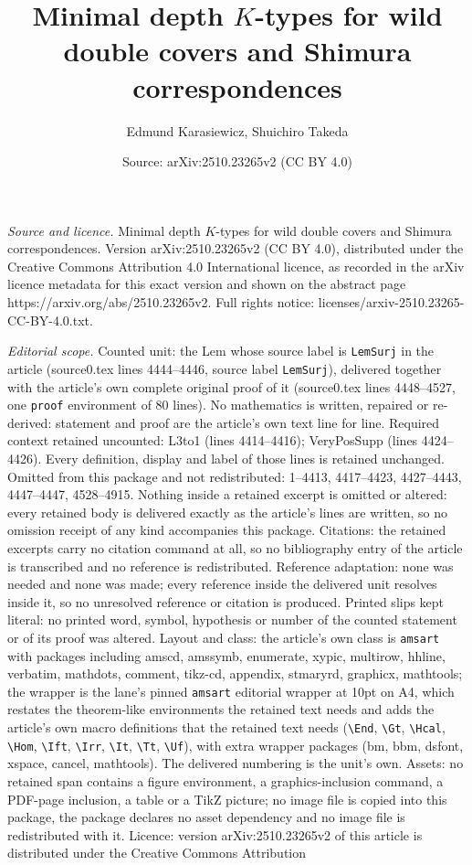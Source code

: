 \documentclass[10pt,a4paper]{amsart}
\title[Minimal depth $K$-types for wild double covers and Shimura c]{Minimal depth $K$-types for wild double covers and Shimura correspondences}
\author{Edmund Karasiewicz, Shuichiro Takeda}
\date{Source: arXiv:2510.23265v2 (CC BY 4.0)}
\begin{document}
\maketitle

\noindent\emph{Source and licence.} Minimal depth $K$-types for wild double covers and Shimura correspondences. Version arXiv:2510.23265v2 (CC BY 4.0), distributed under the Creative Commons Attribution 4.0 International licence, as recorded in the arXiv licence metadata for this exact version and shown on the abstract page https://arxiv.org/abs/2510.23265v2. Full rights notice: licenses/arxiv-2510.23265-CC-BY-4.0.txt.\par\smallskip

\noindent\textit{Editorial scope.} Counted unit: the Lem whose source label is \texttt{LemSurj} in the article (source0.tex lines 4444--4446, source label \texttt{LemSurj}), delivered together with the article's own complete original proof of it (source0.tex lines 4448--4527, one \texttt{proof} environment of 80 lines). No mathematics is written, repaired or re-derived: statement and proof are the article's own text line for line. Required context retained uncounted: L3to1 (lines 4414--4416); VeryPosSupp (lines 4424--4426). Every definition, display and label of those lines is retained unchanged. Omitted from this package and not redistributed: 1--4413, 4417--4423, 4427--4443, 4447--4447, 4528--4915. Nothing inside a retained excerpt is omitted or altered: every retained body is delivered exactly as the article's lines are written, so no omission receipt of any kind accompanies this package. Citations: the retained excerpts carry no citation command at all, so no bibliography entry of the article is transcribed and no reference is redistributed. Reference adaptation: none was needed and none was made; every reference inside the delivered unit resolves inside it, so no unresolved reference or citation is produced. Printed slips kept literal: no printed word, symbol, hypothesis or number of the counted statement or of its proof was altered. Layout and class: the article's own class is \texttt{amsart} with packages including amscd, amssymb, enumerate, xypic, multirow, hhline, verbatim, mathdots, comment, tikz-cd, appendix, stmaryrd, graphicx, mathtools; the wrapper is the lane's pinned \texttt{amsart} editorial wrapper at 10pt on A4, which restates the theorem-like environments the retained text needs and adds the article's own macro definitions that the retained text needs (\texttt{\textbackslash End}, \texttt{\textbackslash Gt}, \texttt{\textbackslash Hcal}, \texttt{\textbackslash Hom}, \texttt{\textbackslash Ift}, \texttt{\textbackslash Irr}, \texttt{\textbackslash It}, \texttt{\textbackslash Tt}, \texttt{\textbackslash Uf}), with extra wrapper packages (bm, bbm, dsfont, xspace, cancel, mathtools). The delivered numbering is the unit's own. Assets: no retained span contains a figure environment, a graphics-inclusion command, a PDF-page inclusion, a table or a TikZ picture; no image file is copied into this package, the package declares no asset dependency and no image file is redistributed with it. Licence: version arXiv:2510.23265v2 of this article is distributed under the Creative Commons Attribution 
\end{document}
